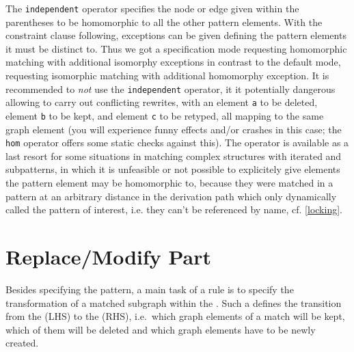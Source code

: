 The \texttt{independent} operator specifies the node or edge given within the parentheses to be homomorphic to all the other pattern elements.
With the constraint clause following, exceptions can be given defining the pattern elements it must be distinct to.
Thus we got a specification mode requesting homomorphic matching with additional isomorphy exceptions in contrast to the default mode,
requesting isomorphic matching with additional homomorphy exception.
It is recommended to \emph{not} use the \texttt{independent} operator, it it potentially dangerous allowing to carry out conflicting rewrites, with an element \texttt{a} to be deleted, element \texttt{b} to be kept, and element \texttt{c} to be retyped, all mapping to the same graph element (you will experience funny effects and/or crashes in this case; the \texttt{hom} operator offers some static checks against this).
The operator is available as a last resort for some situations in matching complex structures with iterated and subpatterns, 
in which it is unfeasible or not possible to explicitely give elements the pattern element may be homomorphic to,
because they were matched in a pattern at an arbitrary distance in the derivation path which only dynamically called the pattern of interest,
i.e. they can't be referenced by name, cf. \ref{locking}.


\section{Replace/Modify Part}
\label{sec:replacemodify}
Besides specifying the pattern, a main task of a rule is to specify the transformation of a matched subgraph within the .
Such a  defines the transition from the  (LHS) to the  (RHS), i.e.\ which graph elements of a match will be kept, which of them will be deleted and which graph elements have to be newly created.

